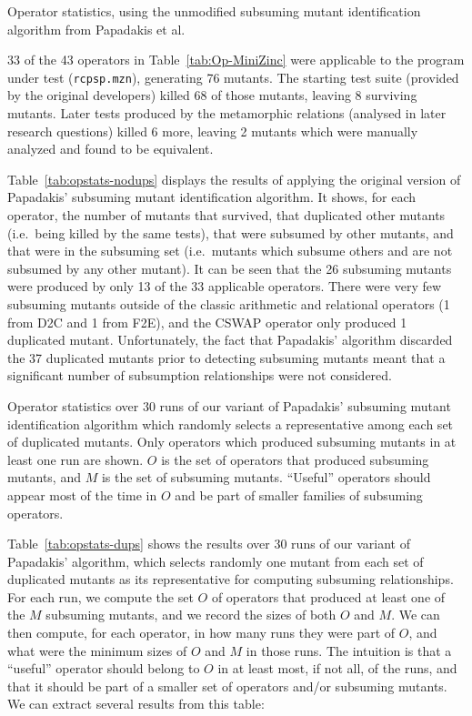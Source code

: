 \begin{table}
    \centering
    
    \caption{Operator statistics, using the unmodified subsuming mutant identification algorithm from Papadakis et al.~\cite{papadakis_threats_2016}}
    \label{tab:opstats-nodups}
\end{table}

33 of the 43 operators in Table~\ref{tab:Op-MiniZinc} were applicable to the program under test (\texttt{rcpsp.mzn}), generating 76 mutants. The starting test suite (provided by the original developers) killed 68 of those mutants, leaving 8 surviving mutants. Later tests produced by the metamorphic relations (analysed in later research questions) killed 6 more, leaving 2 mutants which were manually analyzed and found to be equivalent.

Table~\ref{tab:opstats-nodups} displays the results of applying the original version of Papadakis' subsuming mutant identification algorithm. It shows, for each operator, the number of mutants that survived, that duplicated other mutants (i.e.\ being killed by the same tests), that were subsumed by other mutants, and that were in the subsuming set (i.e.\ mutants which subsume others and are not subsumed by any other mutant). It can be seen that the 26 subsuming mutants were produced by only 13 of the 33 applicable operators. There were very few subsuming mutants outside of the classic arithmetic and relational operators (1 from D2C and 1 from F2E), and the CSWAP operator only produced 1 duplicated mutant. Unfortunately, the fact that Papadakis' algorithm discarded the 37 duplicated mutants prior to detecting subsuming mutants meant that a significant number of subsumption relationships were not considered.

\begin{table}
    \centering
    
    \caption{Operator statistics over 30 runs of our variant of Papadakis' subsuming mutant identification algorithm which randomly selects a representative among each set of duplicated mutants. Only operators which produced subsuming mutants in at least one run are shown. $O$ is the set of operators that produced subsuming mutants, and $M$ is the set of subsuming mutants. ``Useful'' operators should appear most of the time in $O$ and be part of smaller families of subsuming operators.}
    \label{tab:opstats-dups}
\end{table}

Table~\ref{tab:opstats-dups} shows the results over 30 runs of our variant of Papadakis' algorithm, which selects randomly one mutant from each set of duplicated mutants as its representative for computing subsuming relationships.
For each run, we compute the set $O$ of operators that produced at least one of the $M$ subsuming mutants, and we record the sizes of both $O$ and $M$.
We can then compute, for each operator, in how many runs they were part of $O$, and what were the minimum sizes of $O$ and $M$ in those runs.
The intuition is that a ``useful'' operator should belong to $O$ in at least most, if not all, of the runs, and that it should be part of a smaller set of operators and/or subsuming mutants.
We can extract several results from this table:

